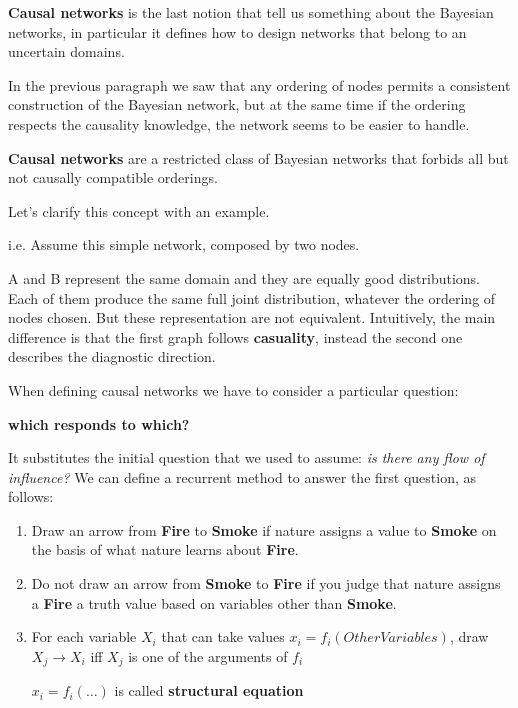\textbf{Causal networks} is the last notion that tell us something about the Bayesian networks, in particular it defines how to design networks that belong to an uncertain
domains. \vspace{3.5pt}

In the previous paragraph we saw that any ordering of nodes permits a consistent construction of the Bayesian network, but at the same time if the ordering respects the 
causality knowledge, the network seems to be easier to handle.
\begin{definition}
    \textbf{Causal networks} are a restricted class of Bayesian networks that forbids all but not causally compatible orderings.
\end{definition}
Let's clarify this concept with an example.
\begin{example}
    i.e. Assume this simple network, composed by two nodes. 
    \begin{center}
    \end{center}
    A and B represent the same domain and they are equally good distributions. Each of them produce the same full joint distribution, whatever the ordering of nodes chosen. 
    But these representation are not equivalent. Intuitively, the main difference is that the first graph follows \textbf{casuality}, instead the second one describes the
    diagnostic direction.
\end{example}
When defining causal networks we have to consider a particular question:
\begin{center}
    \textbf{which responds to which?}
\end{center}
It substitutes the initial question that we used to assume: \textit{is there any flow of influence?} 
We can define a recurrent method to answer the first question, as follows:
\begin{enumerate}
    \item Draw an arrow from \textbf{Fire} to \textbf{Smoke} if nature assigns a value to \textbf{Smoke} on the basis of what nature learns about \textbf{Fire}.
    \item Do not draw an arrow from \textbf{Smoke} to \textbf{Fire} if you judge that nature assigns a \textbf{Fire} a truth value based on variables other than \textbf{Smoke}.
    \item For each variable $X_i$ that can take values $x_i=f_i(OtherVariables)$, draw $X_j \rightarrow X_i$ iff $X_j$ is one of the arguments of $f_i$ 
    \begin{center}
        $x_i = f_i(\dots)$ is called \textbf{structural equation}
    \end{center}
\end{enumerate}
